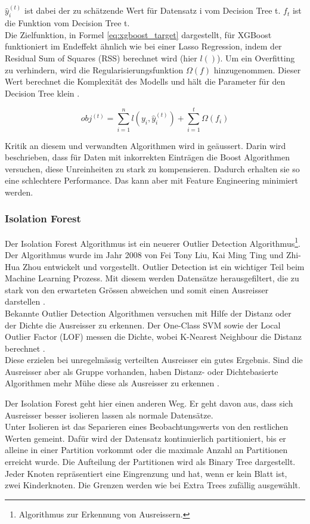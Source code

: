 $\hat{y}_{i}^{(t)}$ ist dabei der zu schätzende Wert für Datensatz i vom Decision Tree t. $f_t$ ist die Funktion vom Decision Tree t.\\[2ex]
%
Die Zielfunktion, in Formel \eqref{eq:xgboost_target} dargestellt, für XGBoost funktioniert im Endeffekt ähnlich wie bei einer Lasso Regression, indem der Residual Sum of Squares (RSS) berechnet wird (hier $l()$).
Um ein Overfitting zu verhindern, wird die Regularisierungsfunktion $\Omega(f)$ hinzugenommen. Dieser Wert berechnet die Komplexität des Modells und hält die Parameter für den Decision Tree klein \cite{xgboost_1, xgboost_2}.

\begin{equation}
\label{eq:xgboost_target}
obj^{(t)} = \sum_{i=1}^{n} l(y_i, \hat{y}_{i}^{(t)}) + \sum_{i=1}^{t} \Omega(f_i)
\end{equation}

Kritik an diesem und verwandten Algorithmen wird in \cite{critic} geäussert. Darin wird beschrieben, dass für Daten mit inkorrekten Einträgen die Boost Algorithmen versuchen, diese Unreinheiten zu stark zu kompensieren. Dadurch erhalten sie so eine schlechtere Performance. Das kann aber mit Feature Engineering minimiert werden.
%
\subsubsection{Isolation Forest}
Der Isolation Forest Algorithmus ist ein neuerer Outlier Detection Algorithmus\footnote{Algorithmus zur Erkennung von Ausreissern.}. Der Algorithmus wurde im Jahr 2008 von Fei Tony Liu, Kai Ming Ting und Zhi-Hua Zhou entwickelt und vorgestellt. Outlier Detection ist ein wichtiger Teil beim Machine Learning Prozess. Mit diesem werden Datensätze herausgefiltert, die zu stark von den erwarteten Grössen abweichen und somit einen Ausreisser darstellen \cite{isolation_forest_1}.\\
Bekannte Outlier Detection Algorithmen versuchen mit Hilfe der Distanz oder der Dichte die Ausreisser zu erkennen. Der One-Class SVM sowie der Local Outlier Factor (LOF) messen die Dichte, wobei K-Nearest Neighbour die Distanz berechnet \cite{isolation_forest_2}.\\
Diese erzielen bei unregelmässig verteilten Ausreisser ein gutes Ergebnis. Sind die Ausreisser aber als Gruppe vorhanden, haben Distanz- oder Dichtebasierte Algorithmen mehr Mühe diese als Ausreisser zu erkennen \cite{isolation_forest_3}.

Der Isolation Forest geht hier einen anderen Weg. Er geht davon aus, dass sich Ausreisser besser isolieren lassen als normale Datensätze.\\
Unter Isolieren ist das Separieren eines Beobachtungswerts von den restlichen Werten gemeint. Dafür wird der Datensatz kontinuierlich partitioniert, bis er alleine in einer Partition vorkommt oder die maximale Anzahl an Partitionen erreicht wurde. Die Aufteilung der Partitionen wird als Binary Tree dargestellt. Jeder Knoten repräsentiert eine Eingrenzung und hat, wenn er kein Blatt ist, zwei Kinderknoten. Die Grenzen werden wie bei Extra Trees zufällig ausgewählt.\\

